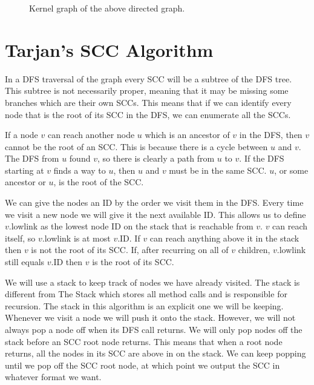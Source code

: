 \documentclass{article}
\begin{document}
\begin{figure}[h]
\center
{}
\caption{Kernel graph of the above directed graph.}
\end{figure}


\section{Tarjan's SCC Algorithm}

In a DFS traversal of the graph every SCC will be a subtree of the DFS tree. This subtree is not necessarily proper, meaning that it may be missing some branches which are their own SCCs.  This means that if we can identify every node that is the root of its SCC in the DFS, we can enumerate all the SCCs.

If a node $v$ can reach another node $u$ which is an ancestor of $v$ in the DFS, then $v$ cannot be the root of an SCC.  This is because there is a cycle between $u$ and $v$.  The DFS from $u$ found $v$, so there is clearly a path from $u$ to $v$.  If the DFS starting at $v$ finds a way to $u$, then $u$ and $v$ must be in the same SCC.  $u$, or some ancestor or $u$, is the root of the SCC.

We can give the nodes an ID by the order we visit them in the DFS.  Every time we visit a new node we will give it the next available ID.  This allows us to define $v$.lowlink as the lowest node ID on the stack that is reachable from $v$.  $v$ can reach itself, so $v$.lowlink is at most $v$.ID. If $v$ can reach anything above it in the stack then $v$ is not the root of its SCC.  If, after recurring on all of $v$ children, $v$.lowlink still equals $v$.ID then $v$ is the root of its SCC.

We will use a stack to keep track of nodes we have already visited.  The stack is different from The Stack which stores all method calls and is responsible for recursion.  The stack in this algorithm is an explicit one we will be keeping.  Whenever we visit a node we will push it onto the stack.  However, we will not always pop a node off when its DFS call returns.  We will only pop nodes off the stack before an SCC root node returns.  This means that when a root node returns, all the nodes in its SCC are above in on the stack.  We can keep popping until we pop off the SCC root node, at which point we output the SCC in whatever format we want.
\end{document}
